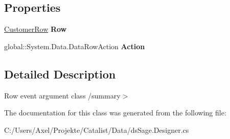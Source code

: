 \subsection*{Properties}
\begin{DoxyCompactItemize}
\item 
\hyperlink{class_products_1_1_data_1_1ds_sage_1_1_customer_row}{Customer\+Row} {\bfseries Row}\hypertarget{class_products_1_1_data_1_1ds_sage_1_1_customer_row_change_event_a6d5b68b20fc4569e512f3d0474512f2e}{}\label{class_products_1_1_data_1_1ds_sage_1_1_customer_row_change_event_a6d5b68b20fc4569e512f3d0474512f2e}

\item 
global\+::\+System.\+Data.\+Data\+Row\+Action {\bfseries Action}\hypertarget{class_products_1_1_data_1_1ds_sage_1_1_customer_row_change_event_a699fbbd80828765a4001dcd7c9eb634e}{}\label{class_products_1_1_data_1_1ds_sage_1_1_customer_row_change_event_a699fbbd80828765a4001dcd7c9eb634e}

\end{DoxyCompactItemize}


\subsection{Detailed Description}
Row event argument class /summary$>$ 

The documentation for this class was generated from the following file\+:\begin{DoxyCompactItemize}
\item 
C\+:/\+Users/\+Axel/\+Projekte/\+Catalist/\+Data/ds\+Sage.\+Designer.\+cs\end{DoxyCompactItemize}
